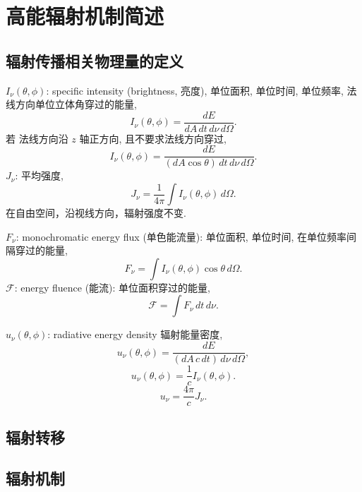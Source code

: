 \chapter{高能辐射机制简述}

\section{辐射传播相关物理量的定义}

$I_\nu(\theta,\phi)$: specific intensity (brightness, 亮度), 单位面积, 单位时间, 单位频率, 法线方向单位立体角穿过的能量,
\begin{equation}
    I_\nu(\theta,\phi)=\frac{d E}{d A\, d t\, d\nu \,d\Omega} .
\end{equation}
若 法线方向沿 $z$ 轴正方向, 且不要求法线方向穿过,
\begin{equation}
    I_\nu(\theta,\phi)=\frac{d E}{(d A\cos\theta) \,d t \,d\nu \,d\Omega} .
\end{equation}
$J_\nu$: 平均强度,
\begin{equation}
    J_\nu=\frac{1 }{4\pi}\int I_\nu(\theta,\phi)\,d\Omega .
\end{equation}
在自由空间，沿视线方向，辐射强度不变.

$F_\nu$:  monochromatic energy flux (单色能流量): 单位面积, 单位时间, 在单位频率间隔穿过的能量,
\begin{equation}
    F_\nu=\int I_\nu(\theta,\phi)\cos\theta \,d\Omega . 
\end{equation}
$\mathcal{F}$: energy fluence (能流): 单位面积穿过的能量, 
\begin{equation}
    \mathcal{F}=\int F_\nu\,dt \,d\nu .
\end{equation}

$u_\nu(\theta,\phi)$: radiative energy density 辐射能量密度,
\begin{equation}
    u_\nu(\theta,\phi)=\frac{d E}{(d A \,c\,d t )\, d\nu \,d\Omega},
\end{equation}
\begin{equation}
    u_\nu(\theta,\phi)=\frac{1}{c}I_\nu(\theta,\phi).
\end{equation}
\begin{equation}
    u_\nu=\frac{4\pi}{c}J_\nu.
\end{equation}

\section{辐射转移}

\section{辐射机制}

